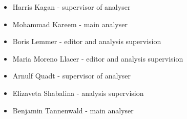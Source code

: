 \clearpage
{}
\begin{itemize}
\item Harris Kagan - supervisor of analyser 
\item Mohammad Kareem - main analyser
\item Boris Lemmer - editor and analysis supervision
\item Maria Moreno Llacer - editor and analysis supervision 
\item Arnulf Quadt - supervisor of analyser
\item Elizaveta Shabalina - analysis supervision 
\item Benjamin Tannenwald - main analyser 
\end{itemize}
\clearpage
